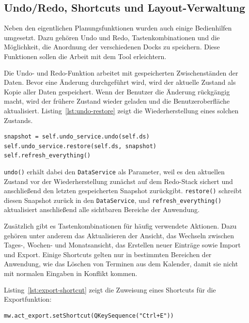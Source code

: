 \documentclass[12pt,a4paper]{article}
\begin{document}
\subsection{Undo/Redo, Shortcuts und Layout-Verwaltung}

Neben den eigentlichen Planungsfunktionen wurden auch einige Bedienhilfen umgesetzt. Dazu gehören Undo und Redo, Tastenkombinationen und die Möglichkeit, die Anordnung der verschiedenen Docks zu speichern. Diese Funktionen sollen die Arbeit mit dem Tool erleichtern.

Die Undo- und Redo-Funktion arbeitet mit gespeicherten Zwischenständen der Daten. Bevor eine Änderung durchgeführt wird, wird der aktuelle Zustand als Kopie aller Daten gespeichert. Wenn der Benutzer die Änderung rückgängig macht, wird der frühere Zustand wieder geladen und die Benutzeroberfläche aktualisiert. Listing~\ref{lst:undo-restore} zeigt die Wiederherstellung eines solchen Zustands.

\begin{lstlisting}[caption={Wiederherstellung eines gespeicherten Zustands}, label={lst:undo-restore}]
snapshot = self.undo_service.undo(self.ds)
self.undo_service.restore(self.ds, snapshot)
self.refresh_everything()
\end{lstlisting}

\texttt{undo()} erhält dabei den \texttt{DataService} als Parameter, weil es den aktuellen Zustand vor der Wiederherstellung zunächst auf dem Redo-Stack sichert und anschließend den letzten gespeicherten Snapshot zurückgibt. \texttt{restore()} schreibt diesen Snapshot zurück in den \texttt{DataService}, und \texttt{refresh\_everything()} aktualisiert anschließend alle sichtbaren Bereiche der Anwendung.


Zusätzlich gibt es Tastenkombinationen für häufig verwendete Aktionen. Dazu gehören unter anderem das Aktualisieren der Ansicht, das Wechseln zwischen Tages-, Wochen- und Monatsansicht, das Erstellen neuer Einträge sowie Import und Export. Einige Shortcuts gelten nur in bestimmten Bereichen der Anwendung, wie das Löschen von Terminen aus dem Kalender, damit sie nicht mit normalen Eingaben in Konflikt kommen.

Listing~\ref{lst:export-shortcut} zeigt die Zuweisung eines Shortcuts für die Exportfunktion:

\begin{lstlisting}[caption={Shortcut für den Datenexport}, label={lst:export-shortcut}]
mw.act_export.setShortcut(QKeySequence("Ctrl+E"))
\end{lstlisting}
\end{document}
